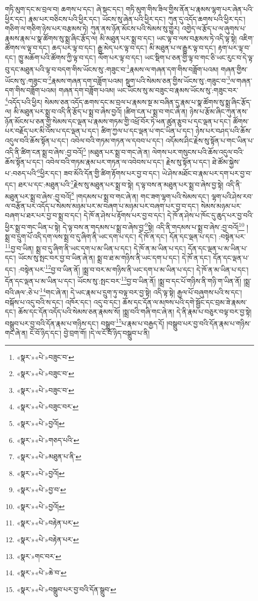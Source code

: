 གཏི་མུག་དང་མ་བྲལ་བ། ཆགས་པ་དང་། ཞེ་སྡང་དང་། གཏི་མུག་གིས་ཟིལ་གྱིས་ནོན་པ་རྣམས་ལྷག་པར་ཞེན་པའི་ཕྱིར་དང་། རྣམ་པར་བཅིངས་པའི་ཕྱིར་དང་། ཡོངས་སུ་ཞེན་པའི་ཕྱིར་དང་། ཀུན་དུ་འདོད་ཆགས་པའི་ཕྱིར་དང་། གཅིག་ལ་གཅིག་ཉེས་པར་བརྩམས་ཏེ། ཀུན་ནས་ཉོན་མོངས་པའི་སེམས་སུ་གྱུར། འགྱེད་ལ་རྩོད་པ་ལ་ཞུགས་པ་རྣམས་རྣམ་པ་སྣ་ཚོགས་སུ་སྨྲ་ཞིང་རྩོད་ལ། མི་མཐུན་པར་སྨྲ་བ་དང་། ཡང་ལྟ་བ་ལས་བརྩམས་ཏེ་འདི་ལྟ་སྟེ། འཇིག་ཚོགས་ལ་ལྟ་བ་དང་། ཆད་པར་ལྟ་བ་དང་། རྒྱུ་མེད་པར་ལྟ་བ་དང་། མི་མཐུན་པ་ལ་རྒྱུར་ལྟ་བ་དང་། རྟག་པར་ལྟ་བ་དང་། ཁྱུ་མཆོག་པའི་ཚོགས་ཀྱི་ལྟ་བ་དང་། ལོག་པར་ལྟ་བ་དང་། ཡང་སྡིག་པ་ཅན་གྱི་ལྟ་བ་གང་ཅི་ཡང་རུང་བ་དེ་ལྟ་བུ་དང་མཐུན་པའི་ལྟ་བ་བདག་གིས་ཡོངས་སུ་:གཟུང་བ་\footnote{«སྣར་»«པེ་»བཟུང་བ་}རྣམས་ལ་གཞན་དག་གིས་བཟློག་པའམ། གཞན་གྱིས་ཡོངས་སུ་:གཟུང་བ་\footnote{«སྣར་»«པེ་»བཟུང་བ་}རྣམས་གཞན་དག་བཟློག་པའམ། སྡུག་པའི་སེམས་ཅན་གྱིས་ཡོངས་སུ་:གཟུང་བ་\footnote{«སྣར་»«པེ་»བཟུང་བ་}ལ་གཞན་དག་གིས་བཟློག་པའམ། གཞན་དག་བཟློག་པའམ། ཡང་ཡོངས་སུ་མ་བཟུང་བ་རྣམས་ཡོངས་སུ་:གཟུང་བར་\footnote{«སྣར་»«པེ་»བཟུང་བར་}འདོད་པའི་ཕྱིར། སེམས་ཅན་འདོད་ཆགས་དང་མ་བྲལ་པ་རྣམས་སྔ་མ་བཞིན་དུ་རྣམ་པ་སྣ་ཚོགས་སུ་སྨྲ་ཞིང་རྩོད་ལ། མི་མཐུན་པར་སྨྲ་བ་འདི་ནི་རྩོད་པ་སྨྲ་བ་ཞེས་བྱའོ། །ཚིག་ངན་པ་སྨྲ་བ་གང་ཞེ་ན། ཉེས་པ་རྩོམ་ཞིང་ཀུན་ནས་ཉོན་མོངས་པ་ཅན་གྱི་སེམས་དང་ལྡན་པ་རྣམས་གཏམ་གྱི་འཕྲོ་བོར་ཏེ་ཕན་ཚུན་རྩུབ་པ་དང་ལྡན་པ་དང་། ཚོགས་པར་བརྗོད་པར་མི་འོས་པ་དང་ལྡན་པ་དང་། ཚིག་ཀྱལ་པ་དང་ལྡན་པ་གང་ཡིན་པ་དང་། ཉེས་པར་བཤད་པའི་ཆོས་འདུལ་བའི་ཆོས་སྟོན་པ་དང་། འབེལ་བའི་གཏམ་གཏན་ལ་དབབ་པ་དང་། འདོམས་ཤིང་རྗེས་སུ་སྟོན་པ་གང་ཡིན་པ་འདི་ནི་ཚིག་ངན་སྨྲ་བ་ཞེས་:བྱ་བའོ།\footnote{«སྣར་»«པེ་»བྱའོ།} །མཐུན་པར་སྨྲ་བ་གང་ཞེ་ན། ལེགས་པར་གསུངས་པའི་ཆོས་འདུལ་བའི་ཆོས་སྟོན་པ་དང་། འབེལ་བའི་གཏམ་རྣམ་པར་གཏན་ལ་འབེབས་པ་དང་། རྗེས་སུ་སྟོན་པ་དང་། ཐེ་ཚོམ་སྐྱེས་པ་:བཅད་པའི་\footnote{«སྣར་»«པེ་»གཅད་པའི་}ཕྱིར་དང་། ཟབ་མོའི་དོན་གྱི་ཚིག་རྟོགས་པར་བྱ་བ་དང་། ཡེ་ཤེས་མཐོང་བ་རྣམ་པར་དག་པར་བྱ་བ་དང་། ཐར་པ་དང་:མཐུན་པའི་\footnote{«སྣར་»«པེ་»མཐུན་པ་ནི་}རྗེས་སུ་མཐུན་པར་སྨྲ་བ་སྟེ། ད་ལྟ་བས་ན་མཐུན་པར་སྨྲ་བ་ཞེས་བྱ་སྟེ། འདི་ནི་མཐུན་པར་སྨྲ་བ་ཞེས་:བྱ་བའོ།\footnote{«སྣར་»«པེ་»བྱའོ།} །གདམས་པ་སྨྲ་བ་གང་ཞེ་ན། གང་ཟག་ལྷག་པའི་སེམས་དང་། ལྷག་པའི་ཤེས་རབ་ལ་བརྩོན་པར་འདོད་པ་སེམས་མཉམ་པར་མ་བཞག་པ་མཉམ་པར་བཞག་པར་བྱ་བ་དང་། སེམས་མཉམ་པར་བཞག་པ་ཐར་པར་བྱ་བ་སྨྲ་བ་དང་། དེ་ཁོ་ན་ཤེས་པ་རྟོགས་པར་བྱ་བ་དང་། དེ་ཁོ་ན་ཤེས་པ་ཁོང་དུ་ཆུད་པར་བྱ་བའི་ཕྱིར་སྨྲ་བ་གང་ཡིན་པ་སྟེ། དེ་ལྟ་བས་ན་གདམས་པ་སྨྲ་བ་ཞེས་བྱ་\footnote{«སྣར་»«པེ་»བྱ་བ་}སྟེ། འདི་ནི་གདམས་པ་སྨྲ་བ་ཞེས་:བྱ་བའོ།\footnote{«སྣར་»«པེ་»བྱའོ།} །སྨྲ་བ་དྲུག་པོ་འདི་དག་ལས་སྨྲ་བ་དུ་ཞིག་ནི་ཡང་དག་པ་དང་། དེ་ཁོ་ན་དང་། དོན་དང་ལྡན་པ་དང་། :བསྟེན་པར་\footnote{«སྣར་»«པེ་»བརྟེན་པར་}བྱ་བ་ཡིན། སྨྲ་བ་དུ་ཞིག་ནི་ཡང་དག་པ་མ་ཡིན་པ་དང་། དེ་ཁོ་ན་མ་ཡིན་པ་དང་། དོན་དང་ལྡན་པ་མ་ཡིན་པ་དང་། ཡོངས་སུ་སྤང་བར་བྱ་བ་ཡིན་ཞེ་ན། སྨྲ་བ་ཐ་མ་གཉིས་ནི་ཡང་དག་པ་དང་། དེ་ཁོ་ན་དང་། དོན་དང་ལྡན་པ་དང་། :བསྟེན་པར་\footnote{«སྣར་»«པེ་»བརྟེན་པར་}བྱ་བ་ཡིན་ནོ། །སྨྲ་བ་བར་མ་གཉིས་ནི་ཡང་དག་པ་མ་ཡིན་པ་དང་། དེ་ཁོ་ན་མ་ཡིན་པ་དང་། དོན་དང་ལྡན་པ་མ་ཡིན་པ་དང་། ཡོངས་སུ་:སྤང་བར་\footnote{«སྣར་»གང་བར་}བྱ་བ་ཡིན་ནོ། །སྨྲ་བ་དང་པོ་གཉིས་ནི་གཉི་ག་ཡིན་ནོ། །སྨྲ་བའི་ཞལ་:ཅེ་པ་\footnote{«སྣར་»«པེ་»ཆེ་བ་}གང་ཞེ་ན། དེ་ཡང་རྣམ་པ་དྲུག་ཏུ་བལྟ་བར་བྱ་སྟེ། འདི་ལྟ་སྟེ། རྒྱལ་པོ་བཞུགས་པའི་ས་དང་། བསྐོས་པ་འདུ་བའི་ས་དང་། འཁོར་དང་། འདུ་བ་དང་། ཆོས་དང་དོན་ལ་མཁས་པའི་དགེ་སྦྱོང་དང་བྲམ་ཟེ་རྣམས་དང་། ཆོས་དང་དོན་འདོད་པའི་སེམས་ཅན་རྣམས་སོ། །སྨྲ་བའི་གཞི་གང་ཞེ་ན། དེ་ནི་རྣམ་པ་བཅུར་བལྟ་བར་བྱ་སྟེ། བསྒྲུབ་པར་བྱ་བའི་དོན་རྣམ་པ་གཉིས་དང་། བསྒྲུབ་\footnote{«སྣར་»«པེ་»བསྒྲུབ་པར་བྱ་བའི་དོན་སྒྲུབ་}པ་རྣམ་པ་བརྒྱད་དོ། །བསྒྲུབ་པར་བྱ་བའི་དོན་རྣམ་པ་གཉིས་གང་ཞེ་ན། ངོ་བོ་ཉིད་དང་། བྱེ་བྲག་གོ། །དེ་ལ་ངོ་བོ་ཉིད་བསྒྲུབ་པ་ནི། 